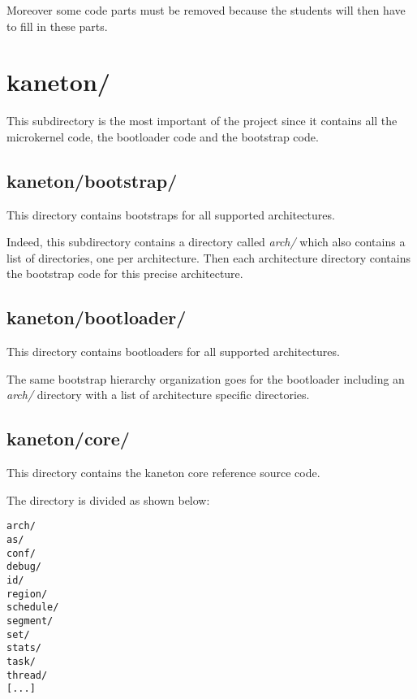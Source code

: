 Moreover some code parts must be removed because the students will
then have to fill in these parts.

%
%

\section{kaneton/}

This subdirectory is the most important of the project since it contains
all the microkernel code, the bootloader code and the bootstrap code.

%
%

\subsection{kaneton/bootstrap/}

This directory contains bootstraps for all supported architectures.

Indeed, this subdirectory contains a directory called \textit{arch/} which
also contains a list of directories, one per architecture. Then each
architecture directory contains the bootstrap code for this precise
architecture.

%
%

\subsection{kaneton/bootloader/}

This directory contains bootloaders for all supported architectures.

The same bootstrap hierarchy organization goes for the bootloader
including an \textit{arch/} directory with a list of architecture
specific directories.

%
%

\subsection{kaneton/core/}

This directory contains the kaneton core reference source code.

The directory is divided as shown below:

\begin{verbatim}
arch/
as/
conf/
debug/
id/
region/
schedule/
segment/
set/
stats/
task/
thread/
[...]
\end{verbatim}

